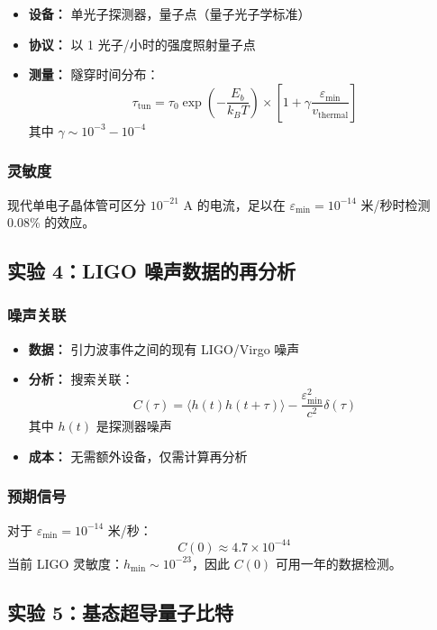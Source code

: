 \documentclass[11pt,a4paper]{article}
\begin{document}
	\begin{itemize}
		\item \textbf{设备：} 单光子探测器，量子点（量子光子学标准）
		\item \textbf{协议：} 以 1 光子/小时的强度照射量子点
		\item \textbf{测量：} 隧穿时间分布：
		\[
		\tau_{\text{tun}} = \tau_0 \exp\left(-\frac{E_b}{k_B T}\right) \times \left[1 + \gamma\frac{\varepsilon_{\min}}{v_{\text{thermal}}}\right]
		\]
		其中 $\gamma \sim 10^{-3} - 10^{-4}$
	\end{itemize}
	
	\subsubsection{灵敏度}
	
	现代单电子晶体管可区分 $10^{-21}$ A 的电流，足以在 $\varepsilon_{\min} = 10^{-14}$ 米/秒时检测 0.08\% 的效应。
	
	\subsection{实验 4：LIGO 噪声数据的再分析}
	
	\subsubsection{噪声关联}
	
	\begin{itemize}
		\item \textbf{数据：} 引力波事件之间的现有 LIGO/Virgo 噪声
		\item \textbf{分析：} 搜索关联：
		\[
		C(\tau) = \langle h(t)h(t+\tau)\rangle - \frac{\varepsilon_{\min}^2}{c^2}\delta(\tau)
		\]
		其中 $h(t)$ 是探测器噪声
		\item \textbf{成本：} 无需额外设备，仅需计算再分析
	\end{itemize}
	
	\subsubsection{预期信号}
	
	对于 $\varepsilon_{\min} = 10^{-14}$ 米/秒：
	\[
	C(0) \approx 4.7 \times 10^{-44}
	\]
	当前 LIGO 灵敏度：$h_{\text{min}} \sim 10^{-23}$，因此 $C(0)$ 可用一年的数据检测。
	
	\subsection{实验 5：基态超导量子比特}
	
\end{document}
